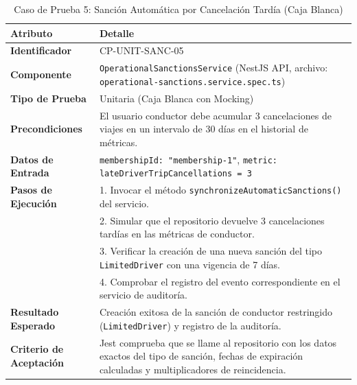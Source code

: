 \documentclass{article}
\begin{document}
\begin{table}[H]
\centering
\small
\caption{Caso de Prueba 5: Sanción Automática por Cancelación Tardía (Caja Blanca)}
\begin{tabularx}{\linewidth}{p{4cm} X}
\toprule
\textbf{Atributo} & \textbf{Detalle} \\
\midrule
\textbf{Identificador} & CP-UNIT-SANC-05 \\
\textbf{Componente} & \texttt{OperationalSanctionsService} (NestJS API, archivo: \texttt{operational-sanctions.service.spec.ts}) \\
\textbf{Tipo de Prueba} & Unitaria (Caja Blanca con Mocking) \\
\textbf{Precondiciones} & El usuario conductor debe acumular 3 cancelaciones de viajes en un intervalo de 30 días en el historial de métricas. \\
\textbf{Datos de Entrada} & \texttt{membershipId: "membership-1"}, \texttt{metric: lateDriverTripCancellations = 3} \\
\textbf{Pasos de Ejecución} & 1. Invocar el método \texttt{synchronizeAutomaticSanctions()} del servicio.\\
& 2. Simular que el repositorio devuelve 3 cancelaciones tardías en las métricas de conductor.\\
& 3. Verificar la creación de una nueva sanción del tipo \texttt{LimitedDriver} con una vigencia de 7 días.\\
& 4. Comprobar el registro del evento correspondiente en el servicio de auditoría.\\
\textbf{Resultado Esperado} & Creación exitosa de la sanción de conductor restringido (\texttt{LimitedDriver}) y registro de la auditoría. \\
\textbf{Criterio de Aceptación} & Jest comprueba que se llame al repositorio con los datos exactos del tipo de sanción, fechas de expiración calculadas y multiplicadores de reincidencia. \\
\bottomrule
\end{tabularx}
\end{table}
\end{document}
